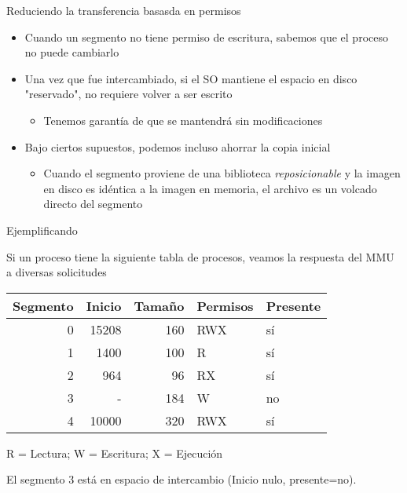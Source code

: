 \documentclass[presentation]{beamer}
\begin{document}
\begin{frame}[label={sec:org292e6b2}]{Reduciendo la transferencia basasda en permisos}
\begin{itemize}
\item Cuando un segmento no tiene permiso de escritura, sabemos que el
proceso no puede cambiarlo
\item Una vez que fue intercambiado, si el SO mantiene el espacio en
disco "reservado", no requiere volver a ser escrito
\begin{itemize}
\item Tenemos garantía de que se mantendrá sin modificaciones
\end{itemize}
\item Bajo ciertos supuestos, podemos incluso ahorrar la copia inicial
\begin{itemize}
\item Cuando el segmento proviene de una biblioteca \emph{reposicionable} y
la imagen en disco es idéntica a la imagen en memoria, el archivo
es un volcado directo del segmento
\end{itemize}
\end{itemize}
\end{frame}

\begin{frame}[label={sec:org7081a0f}]{Ejemplificando}
\begin{center}
Si un proceso tiene la siguiente tabla de procesos, veamos la
respuesta del MMU a diversas solicitudes
\end{center}
\begin{center}
\begin{tabular}{rrrll}
Segmento & Inicio & Tamaño & Permisos & Presente\\
\hline
0 & 15208 & 160 & RWX & sí\\
1 & 1400 & 100 & R & sí\\
2 & 964 & 96 & RX & sí\\
3 & - & 184 & W & no\\
4 & 10000 & 320 & RWX & sí\\
\end{tabular}
\end{center}

\begin{center}
{\scriptsize
R = Lectura; W = Escritura; X = Ejecución

El segmento 3 está en espacio de intercambio (Inicio nulo,
presente=no).
}
\end{center}
\end{frame}
\end{document}
